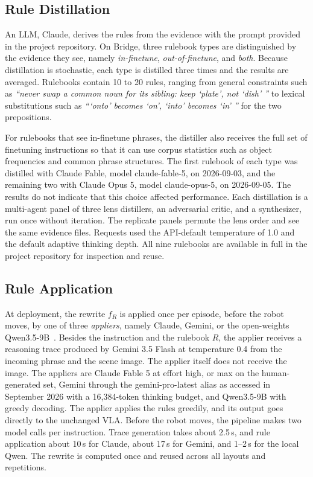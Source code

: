 \documentclass[letterpaper, 10 pt, conference]{ieeeconf} %
\begin{document}
\subsection{Rule Distillation}

An LLM, Claude, derives the rules from the evidence with the prompt provided in the project repository. On Bridge, three rulebook types are distinguished by the evidence they see, namely \emph{in-finetune}, \emph{out-of-finetune}, and \emph{both}. Because distillation is stochastic, each type is distilled three times and the results are averaged. Rulebooks contain 10 to 20 rules, ranging from general constraints such as \textit{``never swap a common noun for its sibling: keep `plate', not `dish' ''} to lexical substitutions such as \textit{```onto' becomes `on', `into' becomes `in' ''} for the two prepositions.

For rulebooks that see in-finetune phrases, the distiller also receives the full set of finetuning instructions so that it can use corpus statistics such as object frequencies and common phrase structures. The first rulebook of each type was distilled with Claude Fable, model claude-fable-5, on 2026-09-03, and the remaining two with Claude Opus 5, model claude-opus-5, on 2026-09-05. The results do not indicate that this choice affected performance.
Each distillation is a multi-agent panel of three lens distillers, an adversarial critic, and a synthesizer, run once without iteration. The replicate panels permute the lens order and see the same evidence files. Requests used the API-default temperature of 1.0 and the default adaptive thinking depth.
All nine rulebooks are available in full in the project repository for inspection and reuse.

\subsection{Rule Application}

At deployment, the rewrite $f_R$ is applied once per episode, before the robot moves, by one of three \emph{appliers}, namely Claude, Gemini, or the open-weights Qwen3.5-9B~\cite{qwen}. Besides the instruction and the rulebook $R$, the applier receives a reasoning trace produced by Gemini 3.5 Flash at temperature 0.4 from the incoming phrase and the scene image. The applier itself does not receive the image. The appliers are Claude Fable 5 at effort high, or max on the human-generated set, Gemini through the gemini-pro-latest alias as accessed in September 2026 with a 16{,}384-token thinking budget, and Qwen3.5-9B with greedy decoding. The applier applies the rules greedily, and its output goes directly to the unchanged VLA.
Before the robot moves, the pipeline makes two model calls per instruction. Trace generation takes about 2.5\,s, and rule application about 10\,s for Claude, about 17\,s for Gemini, and 1--2\,s for the local Qwen. The rewrite is computed once and reused across all layouts and repetitions.
\end{document}
